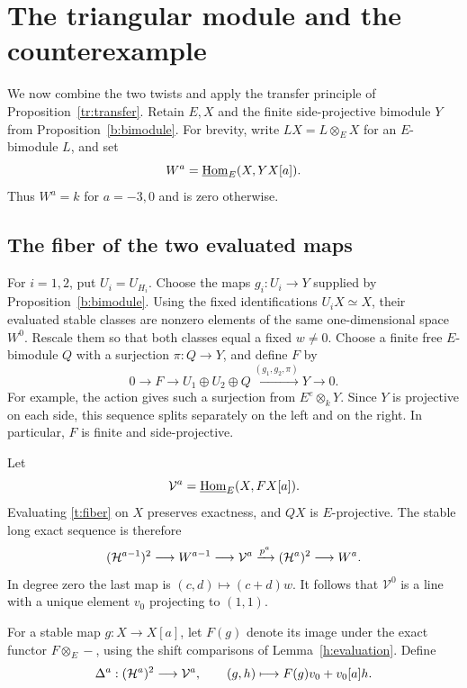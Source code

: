 \section{The triangular module and the counterexample}
\label{sec:triangular}

We now combine the two twists and apply the transfer principle of
Proposition~\ref{tr:transfer}.  Retain $E,X$ and the finite
side-projective bimodule $Y$ from Proposition~\ref{b:bimodule}.
For brevity, write $LX=L\otimes_E X$ for an $E$-bimodule $L$, and set
\[
 W^a=\underline{\operatorname{Hom}}_E(X,YX[a]).
\]
Thus $W^a=k$ for $a=-3,0$ and is zero otherwise.

\subsection{The fiber of the two evaluated maps}

For $i=1,2$, put $U_i=U_{H_i}$.  Choose the maps
$g_i:U_i\to Y$ supplied by Proposition~\ref{b:bimodule}.
Using the fixed identifications $U_iX\simeq X$, their evaluated stable
classes are nonzero elements of the same one-dimensional space
$W^0$.  Rescale them so that both classes equal a fixed $w\ne0$.
Choose a finite free $E$-bimodule $Q$ with a surjection
$\pi:Q\to Y$, and define $F$ by
\begin{equation}\label{t:fiber}
 0\longrightarrow F\longrightarrow U_1\oplus U_2\oplus Q
 \xrightarrow{(g_1,g_2,\pi)}Y\longrightarrow0.
\end{equation}
For example, the action gives such a surjection from $E^e\otimes_kY$.
Since $Y$ is projective on each side, this sequence splits separately
on the left and on the right.  In particular, $F$ is finite and
side-projective.

Let
\[
 \mathcal V^a=\underline{\operatorname{Hom}}_E(X,FX[a]).
\]
Evaluating \eqref{t:fiber} on $X$ preserves exactness, and $QX$ is
$E$-projective.  The stable long exact sequence is therefore
\begin{equation}\label{t:fiber-hom}
 (\mathcal H^{a-1})^2\longrightarrow W^{a-1}
 \longrightarrow\mathcal V^a
 \xrightarrow{p^a}(\mathcal H^a)^2\longrightarrow W^a.
\end{equation}
In degree zero the last map is
$(c,d)\mapsto(c+d)w$.  It follows that $\mathcal V^0$ is a line with a
unique element $v_0$ projecting to $(1,1)$.

For a stable map $g:X\to X[a]$, let $F(g)$ denote its image under
the exact functor $F\otimes_E-$, using the shift comparisons of
Lemma~\ref{h:evaluation}.  Define
\begin{equation}\label{t:delta}
 \Delta^a:(\mathcal H^a)^2\longrightarrow\mathcal V^a,
 \qquad (g,h)\longmapsto F(g)v_0+v_0[a]h.
\end{equation}

